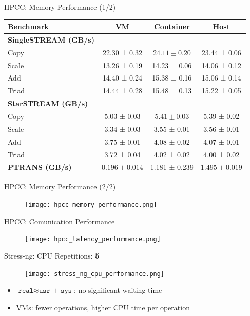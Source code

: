 \documentclass[10pt]{beamer}
\begin{document}
\begin{frame}{HPCC: Memory Performance (1/2)}
  \begin{table}[htbt]
  \centering
  \footnotesize
  \begin{tabular}{lccc}
  \toprule
  \textbf{Benchmark} & \textbf{VM} & \textbf{Container} & \textbf{Host} \\
  \midrule
  \textbf{SingleSTREAM (GB/s)} & & & \\
  Copy   & 22.30 ± 0.32 & $\mathbf{24.11 \pm 0.20}$ & 23.44 ± 0.06 \\
  Scale  & 13.26 ± 0.19 & 14.23 ± 0.06 & 14.06 ± 0.12 \\
  Add    & 14.40 ± 0.24 & 15.38 ± 0.16 & 15.06 ± 0.14 \\
  Triad  & 14.44 ± 0.28 & 15.48 ± 0.13 & 15.22 ± 0.05 \\
  \midrule
  \textbf{StarSTREAM (GB/s)} & & & \\
  Copy   & 5.03 ± 0.03 & $\mathbf{5.41 \pm 0.03}$ & 5.39 ± 0.02 \\
  Scale  & 3.34 ± 0.03 & 3.55 ± 0.01 & 3.56 ± 0.01 \\
  Add    & 3.75 ± 0.01 & 4.08 ± 0.02 & 4.07 ± 0.01 \\
  Triad  & 3.72 ± 0.04 & 4.02 ± 0.02 & 4.00 ± 0.02 \\
  \midrule
  \textbf{PTRANS (GB/s)} & $0.196 \pm 0.014$ & 1.181 ± 0.239 & $\mathbf{1.495 \pm 0.019}$ \\
  \bottomrule
  \end{tabular}
  \end{table}

\end{frame}



\begin{frame}{HPCC: Memory Performance (2/2)}
  \begin{figure}
    \centering
    \texttt{[image: hpcc\_memory\_performance.png]}
  \end{figure}
\end{frame}

\begin{frame}{HPCC: Comunication Performance}
  \begin{figure}
    \centering
    \texttt{[image: hpcc\_latency\_performance.png]}
  \end{figure}

\end{frame}

\begin{frame}{Stress-ng: CPU}
  Repetitions: \textbf{5}
  \begin{figure}
    \centering
    \texttt{[image: stress\_ng\_cpu\_performance.png]}
  \end{figure}
  \begin{itemize}
    \item $\texttt{real} \approx \texttt{usr + sys}$: no significant waiting time
    \item VMs: fewer operations, higher CPU time per operation
  \end{itemize}
\end{frame}
\end{document}
